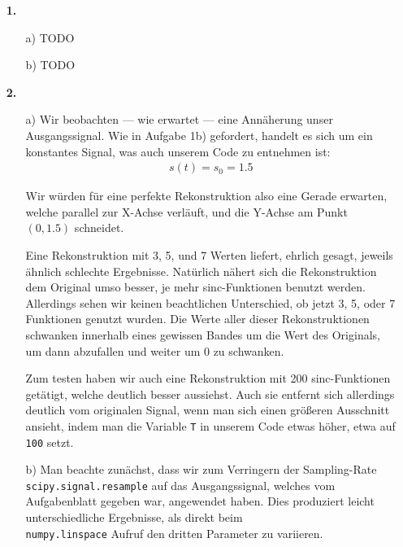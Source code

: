 \documentclass[a4paper,11pt]{article}
\author{\authorinfotitle}
\title{\titleinfo}
\date{\today}
\begin{document}
	\maketitle
	\begin{enumerate}
		\item[\textbf{1.}]
			\begin{enumerate}
				\item[a)]
					TODO
				\item[b)]
					TODO
			\end{enumerate}
		\item[\textbf{2.}]
			\begin{enumerate}
				\item[a)]
					Wir beobachten --- wie erwartet --- eine Annäherung unser
					Ausgangssignal. Wie in Aufgabe 1b) gefordert, handelt es
					sich um ein konstantes Signal, was auch unserem Code
					zu entnehmen ist:
					\begin{align*}
						s(t) = s_0 = 1.5
					\end{align*}

					Wir würden für eine perfekte Rekonstruktion also eine Gerade
					erwarten, welche parallel zur X-Achse verläuft, und die
					Y-Achse am Punkt $(0, 1.5)$ schneidet.

					Eine Rekonstruktion mit 3, 5, und 7 Werten liefert, ehrlich
					gesagt, jeweils ähnlich schlechte Ergebnisse. Natürlich
					nähert sich die Rekonstruktion dem Original umso besser,
					je mehr sinc-Funktionen benutzt werden. Allerdings sehen wir
					keinen beachtlichen Unterschied, ob jetzt 3, 5, oder 7
					Funktionen genutzt wurden. Die Werte aller dieser Rekonstruktionen
					schwanken innerhalb eines gewissen Bandes um die Wert
					des Originals, um dann abzufallen und weiter um 0 zu schwanken.

					Zum testen haben wir auch eine Rekonstruktion mit 200 sinc-Funktionen
					getätigt, welche deutlich besser aussiehst. Auch sie entfernt
					sich allerdings deutlich vom originalen Signal, wenn man sich
					einen größeren Ausschnitt ansieht, indem man die
					Variable \texttt{T} in unserem Code etwas höher, etwa auf
					\texttt{100} setzt.
				\item[b)]
					Man beachte zunächst, dass wir zum Verringern der
					Sampling-Rate \texttt{scipy.signal.resample} auf das Ausgangssignal,
					welches vom Aufgabenblatt gegeben war, angewendet haben.
					Dies produziert leicht unterschiedliche Ergebnisse, als
					direkt beim \\
					\texttt{numpy.linspace} Aufruf den dritten Parameter
					zu variieren.


\end{enumerate}
\end{enumerate}
\end{document}

